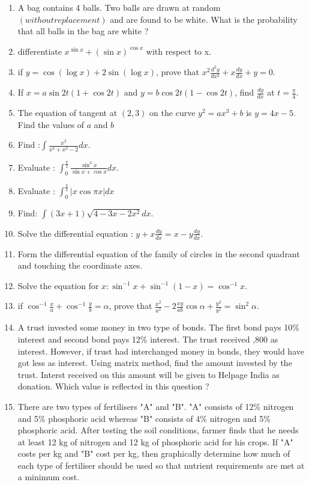 \documentclass[journal,12pt,onecolumn]{IEEEtran}
\theoremstyle{remark}
\providecommand{\brak}[1]{\ensuremath{\left(#1\right)}}
\providecommand{\abs}[1]{\left\vert#1\right\vert}
\begin{document}
\begin{enumerate}
    \item A bag contains 4 balls. Two balls are drawn at random \brak{without replacement} and are found to be white. What is the probability that all balls in the bag are white ?
    \item differentiate $x^{\sin x}+ \brak{\sin x}^{\cos x}$ with respect to x.
    \item if $y=\cos \brak{\log x} + 2 \sin \brak{\log x}$, prove that $x^2 \frac{d^2 y}{dx^2} + x \frac{dy}{dx} +y =0$.
    \item If $x=a\sin 2t\brak{1+\cos 2t}$ and $y=b\cos 2t\brak{1-\cos 2t}$, find $\frac{dy}{dx}$ at $t=\frac{\pi}{4}$.
    \item The equation of tangent at \brak{2,3} on the curve $y^2 = ax^3 + b$ is $y = 4x -5$. Find the values of $a$ and $b$
    \item Find :$\int \frac{x^2}{x^4 + x^2 -2}dx$.
    \item Evaluate : $\int_{0}^{\frac{\pi}{2}} \frac{\sin^2 x}{\sin x + \cos x} dx$.
    \item Evaluate : $\int_{0}^{\frac{3}{2}} \abs{x \cos \pi x}dx$
    \item Find: $\int \brak{3x +1}\sqrt{4-3x-2x^2} dx$.
    \item Solve the differential equation : $y+ x\frac{dy}{dx} = x-y\frac{dy}{dx}$.
    \item Form the differential equation of the family of circles in the second quadrant and touching the coordinate axes.
    \item Solve the equation for $x: \sin^{-1} x + \sin^{-1}\brak{1-x} = \cos^{-1}x$.
    \item if $\cos^{-1}\frac{x}{a} + \cos^{-1}\frac{y}{b} = \alpha$, prove that $\frac{x^2}{a^2} -2\frac{xy}{ab}\cos \alpha + \frac{y^2}{b^2} = \sin^2 \alpha$.
    \item A trust invested some money in two type of bonds. The first bond pays 10\% interest and second bond pays 12\% interest. The trust received ,800 as interest. However, if trust had interchanged money in bonds, they would have got  less as interest. Using matrix method, find the amount invested by the trust. Interst received on this amount will be given to Helpage India as donation. Which value is reflected in this question ?
    \item There are two types of fertilisers "A" and "B". "A" consists of 12\% nitrogen and 5\% phosphoric acid whereas "B" consists of 4\% nitrogen and 5\% phosphoric acid. After testing the soil conditions, farmer finds that he needs at least 12 kg of nitrogen and 12 kg of phosphoric acid for his crops. If "A" costs  per kg and "B" cost  per kg, then graphically determine how much of each type of fertiliser should be used so that nutrient requirements are met at a minimum cost.

\end{enumerate}
\end{document}
